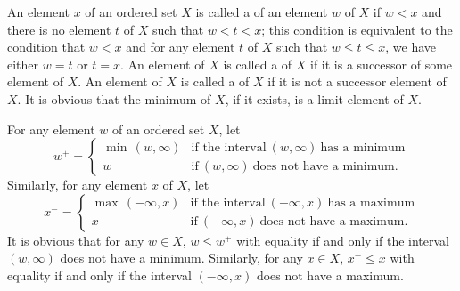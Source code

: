 \documentclass{article}
\begin{document}
An element \(x\) of an ordered set \(X\) is called a
 of an element \(w\) of \(X\) if \(w < x\) and
there is no element \(t\) of \(X\) such that \(w < t < x\); this
condition is equivalent to the condition that \(w < x\) and for any
element \(t\) of \(X\) such that \(w \leq t \leq x\), we have either
\(w = t\) or \(t = x\).  An element of \(X\) is called a
 of \(X\) if it is a successor of some
element of \(X\).  An element of \(X\) is called a  of \(X\) if it is not a successor element of \(X\).  It is
obvious that the minimum of \(X\), if it exists, is a limit element of
\(X\).

For any element \(w\) of an ordered set \(X\), let
\begin{displaymath}
  w^+ =
  \begin{cases}
    \min \, (w, \infty)
    & \text{if the interval} ~ (w, \infty) ~
      \text{has a minimum} \\
    w
    & \text{if} ~ (w, \infty) ~
      \text{does not have a minimum}.
  \end{cases}
\end{displaymath}
Similarly, for any element \(x\) of \(X\), let
\begin{displaymath}
  x^- =
  \begin{cases}
    \max \, (-\infty, x)
    & \text{if the interval} ~ (-\infty, x) ~
      \text{has a maximum} \\
    x
    & \text{if} ~ (-\infty, x) ~
      \text{does not have a maximum}.
  \end{cases}
\end{displaymath}
It is obvious that for any \(w \in X\), \(w \leq w^+\) with equality
if and only if the interval \((w, \infty)\) does not have a minimum.
Similarly, for any \(x \in X\), \(x^- \leq x\) with equality if and
only if the interval \((-\infty, x)\) does not have a maximum.
\end{document}
